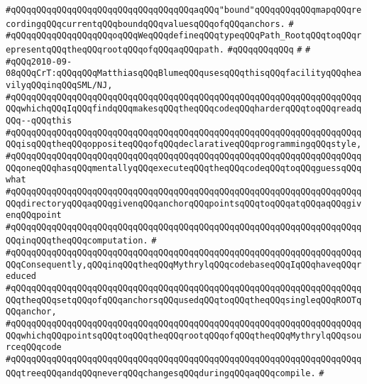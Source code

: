 \verb|#qQQqqQQqqQQqqQQqqQQqqQQqqQQqqQQqqQQqaqQQq"bound"qQQqqQQqqQQqmapqQQqrecordingqQQqcurrentqQQqboundqQQqvaluesqQQqofqQQqanchors.|\newline
\verb|#|\newline
\verb|#qQQqqQQqqQQqqQQqqQQqoqQQqWeqQQqdefineqQQqtypeqQQqPath_RootqQQqtoqQQqrepresentqQQqtheqQQqrootqQQqofqQQqaqQQqpath.|\newline
\verb|#qQQqqQQqqQQq|\newline
\verb|#|\newline
\verb|#|\newline
\verb|#qQQq2010-09-08qQQqCrT:qQQqqQQqMatthiasqQQqBlumeqQQqusesqQQqthisqQQqfacilityqQQqheavilyqQQqinqQQqSML/NJ,|\newline
\verb|#qQQqqQQqqQQqqQQqqQQqqQQqqQQqqQQqqQQqqQQqqQQqqQQqqQQqqQQqqQQqqQQqqQQqqQQqwhichqQQqIqQQqfindqQQqmakesqQQqtheqQQqcodeqQQqharderqQQqtoqQQqreadqQQq--qQQqthis|\newline
\verb|#qQQqqQQqqQQqqQQqqQQqqQQqqQQqqQQqqQQqqQQqqQQqqQQqqQQqqQQqqQQqqQQqqQQqqQQqisqQQqtheqQQqoppositeqQQqofqQQqdeclarativeqQQqprogrammingqQQqstyle,|\newline
\verb|#qQQqqQQqqQQqqQQqqQQqqQQqqQQqqQQqqQQqqQQqqQQqqQQqqQQqqQQqqQQqqQQqqQQqqQQqoneqQQqhasqQQqmentallyqQQqexecuteqQQqtheqQQqcodeqQQqtoqQQqguessqQQqwhat|\newline
\verb|#qQQqqQQqqQQqqQQqqQQqqQQqqQQqqQQqqQQqqQQqqQQqqQQqqQQqqQQqqQQqqQQqqQQqqQQqdirectoryqQQqaqQQqgivenqQQqanchorqQQqpointsqQQqtoqQQqatqQQqaqQQqgivenqQQqpoint|\newline
\verb|#qQQqqQQqqQQqqQQqqQQqqQQqqQQqqQQqqQQqqQQqqQQqqQQqqQQqqQQqqQQqqQQqqQQqqQQqinqQQqtheqQQqcomputation.|\newline
\verb|#|\newline
\verb|#qQQqqQQqqQQqqQQqqQQqqQQqqQQqqQQqqQQqqQQqqQQqqQQqqQQqqQQqqQQqqQQqqQQqqQQqConsequently,qQQqinqQQqtheqQQqMythrylqQQqcodebaseqQQqIqQQqhaveqQQqreduced|\newline
\verb|#qQQqqQQqqQQqqQQqqQQqqQQqqQQqqQQqqQQqqQQqqQQqqQQqqQQqqQQqqQQqqQQqqQQqqQQqtheqQQqsetqQQqofqQQqanchorsqQQqusedqQQqtoqQQqtheqQQqsingleqQQqROOTqQQqanchor,|\newline
\verb|#qQQqqQQqqQQqqQQqqQQqqQQqqQQqqQQqqQQqqQQqqQQqqQQqqQQqqQQqqQQqqQQqqQQqqQQqwhichqQQqpointsqQQqtoqQQqtheqQQqrootqQQqofqQQqtheqQQqMythrylqQQqsourceqQQqcode|\newline
\verb|#qQQqqQQqqQQqqQQqqQQqqQQqqQQqqQQqqQQqqQQqqQQqqQQqqQQqqQQqqQQqqQQqqQQqqQQqtreeqQQqandqQQqneverqQQqchangesqQQqduringqQQqaqQQqcompile.|\newline
\verb|#|\newline
